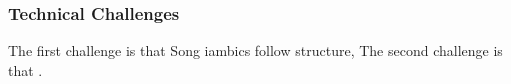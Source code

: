 \subsubsection{Technical Challenges}
The first challenge is that Song iambics follow structure,
The second challenge is that .


 
